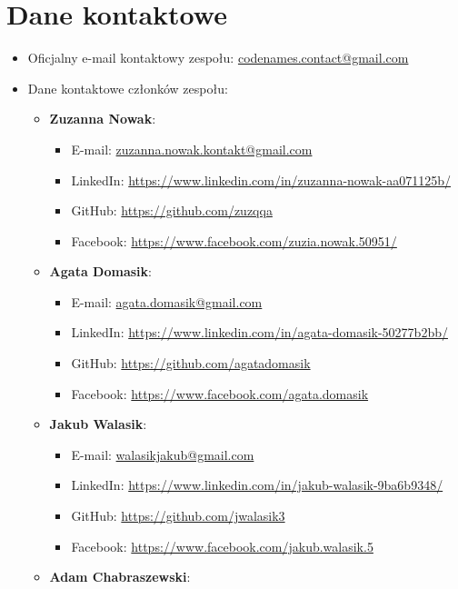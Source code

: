 \documentclass[12pt,a4paper,colorlinks=true,linkcolor=NavyBlue,citecolor=red,urlcolor=NavyBlue]{book}
\begin{document}
\section{Dane kontaktowe}
\begin{itemize}
    \item Oficjalny e-mail kontaktowy zespołu: 
    \href{mailto:codenames.contact@gmail.com}{codenames.contact@gmail.com}
    \item Dane kontaktowe członków zespołu:
    \begin{itemize}
        \item \textbf{Zuzanna Nowak}:
        \begin{itemize}
            \item E-mail: \href{mailto:zuzanna.nowak.kontakt@gmail.com}{zuzanna.nowak.kontakt@gmail.com} 
            \item LinkedIn: \url{https://www.linkedin.com/in/zuzanna-nowak-aa071125b/} 
            \item GitHub: \url{https://github.com/zuzqqa}
            \item Facebook: \url{https://www.facebook.com/zuzia.nowak.50951/}
        \end{itemize}
        \item \textbf{Agata Domasik}:
        \begin{itemize}
            \item E-mail: \href{mailto:agata.domasik@gmail.com}{agata.domasik@gmail.com} 
            \item LinkedIn: \url{https://www.linkedin.com/in/agata-domasik-50277b2bb/}
            \item GitHub: \url{https://github.com/agatadomasik}
            \item Facebook: \url{https://www.facebook.com/agata.domasik}
        \end{itemize}
        \item \textbf{Jakub Walasik}:
        \begin{itemize}
            \item E-mail: \href{mailto:walasikjakub@gmail.com}{walasikjakub@gmail.com}  
            \item LinkedIn: \url{https://www.linkedin.com/in/jakub-walasik-9ba6b9348/}
            \item GitHub: \url{https://github.com/jwalasik3}
            \item Facebook: \url{https://www.facebook.com/jakub.walasik.5}
        \end{itemize}
        \item \textbf{Adam Chabraszewski}:

\end{itemize}
\end{itemize}
\end{document}
